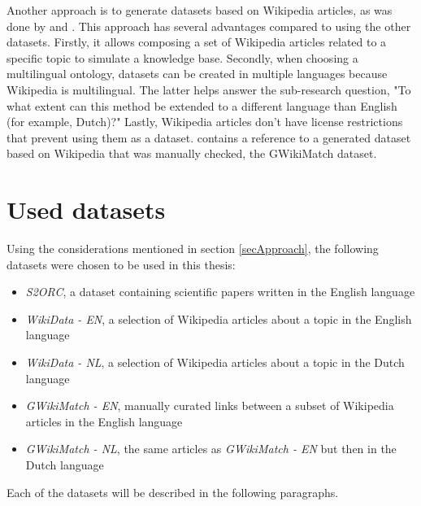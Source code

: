 Another approach is to generate datasets based on Wikipedia articles, as was done by \citet{jiang2019semantic} and \citet{512Tokens}. This approach has several advantages compared to using the other datasets. Firstly, it allows composing a set of Wikipedia articles related to a specific topic to simulate a knowledge base. Secondly, when choosing a multilingual ontology, datasets can be created in multiple languages because Wikipedia is multilingual. The latter helps answer the sub-research question, "To what extent can this method be extended to a different language than English (for example, Dutch)?" %
Lastly, Wikipedia articles don’t have license restrictions that prevent using them as a dataset. \citep{512Tokens} contains a reference to a generated dataset based on Wikipedia that was manually checked, the GWikiMatch dataset. \\

%

\section{Used datasets}
\label{secUsedDatasets}
Using the considerations mentioned in section \ref{secApproach}, the following datasets were chosen to be used in this thesis:
\begin{itemize}
  \item \textit{S2ORC}, a dataset containing scientific papers written in the English language
  \item \textit{WikiData - EN}, a selection of Wikipedia articles about a topic in the English language
  \item \textit{WikiData - NL}, a selection of Wikipedia articles about a topic in the Dutch language
  \item \textit{GWikiMatch - EN}, manually curated links between a subset of Wikipedia articles in the English language
  \item \textit{GWikiMatch - NL}, the same articles as \textit{GWikiMatch - EN} but then in the Dutch language
\end{itemize}
Each of the datasets will be described in the following paragraphs.

